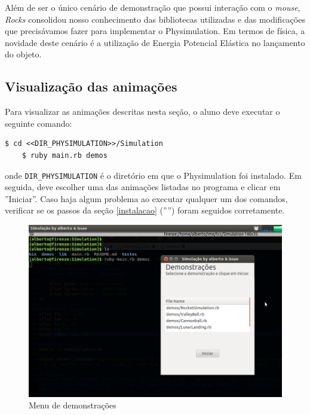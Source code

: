 Além de ser o único cenário de demonstração que possui interação com o \textit{mouse}, \textit{Rocks} consolidou nosso conhecimento das bibliotecas utilizadas e das modificações que precisávamos fazer para implementar o Physimulation. Em termos de física, a novidade deste cenário é a utilização de Energia Potencial Elástica no lançamento do objeto. 

\subsection{Visualização das animações}
Para visualizar as animações descritas nesta seção, o aluno deve executar o seguinte comando:

\begin{Verbatim}[fontsize=\footnotesize]
	$ cd <<DIR_PHYSIMULATION>>/Simulation
	$ ruby main.rb demos
\end{Verbatim}

\noindent onde {\tt\footnotesize DIR\_PHYSIMULATION} é o diretório em que o Physimulation foi instalado. Em seguida, deve escolher uma das animações listadas no programa e clicar em ''Iniciar''. Caso haja algum problema ao executar qualquer um dos comandos, verificar se os passos da seção \ref{instalacao} ('''') foram seguidos corretamente.

\begin{figure}[H]
	\centering
	\includegraphics[scale=0.3]{images/demos-menu.png}
	\caption{Menu de demonstrações}
\end{figure}


